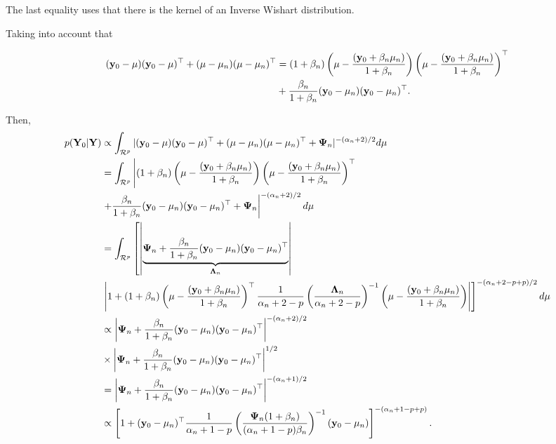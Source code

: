 \begin{enumerate}[leftmargin=*]
The last equality uses that there is the kernel of an Inverse Wishart distribution.

Taking into account that

{\scriptsize{
\begin{align*}
	({\bf{y}}_0-\mu)({\bf{y}}_0-\mu)^{\top}+(\mu-\mu_n)(\mu-\mu_n)^{\top} & = (1+\beta_n)\left(\mu-\frac{({\bf{y}}_0+\beta_n\mu_n)}{1+\beta_n}\right)\left(\mu-\frac{({\bf{y}}_0+\beta_n\mu_n)}{1+\beta_n}\right)^{\top}\\
	&+\frac{\beta_n}{1+\beta_n}({\bf{y}}_0-\mu_n)({\bf{y}}_0-\mu_n)^{\top}.
\end{align*}
}}

Then,
{\scriptsize{
\begin{align*}
	p({\bf{Y}}_0|{\bf{Y}})&\propto\int_{\mathcal{R}^p}|({\bf{y}}_0-\mu)({\bf{y}}_0-\mu)^{\top}+(\mu-\mu_n)(\mu-\mu_n)^{\top}+\mathbf{\Psi}_n|^{-(\alpha_n+2)/2}d\mu\\
	&=\int_{\mathcal{R}^p}\left\vert(1+\beta_n)\left(\mu-\frac{({\bf{y}}_0+\beta_n\mu_n)}{1+\beta_n}\right)\left(\mu-\frac{({\bf{y}}_0+\beta_n\mu_n)}{1+\beta_n}\right)^{\top}\right.\\
	&\left.+\frac{\beta_n}{1+\beta_n}({\bf{y}}_0-\mu_n)({\bf{y}}_0-\mu_n)^{\top}+\mathbf{\Psi}_n\right\vert^{-(\alpha_n+2)/2}d\mu\\
	&=\int_{\mathcal{R}^p}\left[\left\vert\underbrace{\mathbf{\Psi}_n+\frac{\beta_n}{1+\beta_n}({\bf{y}}_0-\mu_n)({\bf{y}}_0-\mu_n)^{\top}}_{\mathbf{\Lambda}_n}\right\vert\right.\\
	&\left.\left\vert 1+(1+\beta_n)\left(\mu-\frac{({\bf{y}}_0+\beta_n\mu_n)}{1+\beta_n}\right)^{\top}\frac{1}{\alpha_n+2-p}\left(\frac{\mathbf{\Lambda}_n}{\alpha_n+2-p}\right)^{-1}\left(\mu-\frac{({\bf{y}}_0+\beta_n\mu_n)}{1+\beta_n}\right)\right\vert\right]^{-(\alpha_n+2-p+p)/2}d\mu\\
	&\propto \left\vert\mathbf{\Psi}_n+\frac{\beta_n}{1+\beta_n}({\bf{y}}_0-\mu_n)({\bf{y}}_0-\mu_n)^{\top}\right\vert^{-(\alpha_n+2)/2}\\
	&\times \left\vert\mathbf{\Psi}_n+\frac{\beta_n}{1+\beta_n}({\bf{y}}_0-\mu_n)({\bf{y}}_0-\mu_n)^{\top}\right\vert^{1/2}\\
	&=\left\vert\mathbf{\Psi}_n+\frac{\beta_n}{1+\beta_n}({\bf{y}}_0-\mu_n)({\bf{y}}_0-\mu_n)^{\top}\right\vert^{-(\alpha_n+1)/2}\\
	&\propto \left[1+({\bf{y}}_0-\mu_n)^{\top}\frac{1}{\alpha_n+1-p}\left(\frac{\mathbf{\Psi}_n(1+\beta_n)}{(\alpha_n+1-p)\beta_n}\right)^{-1}({\bf{y}}_0-\mu_n)\right]^{-(\alpha_n+1-p+p)}. 
\end{align*} 
}}


\end{enumerate}
